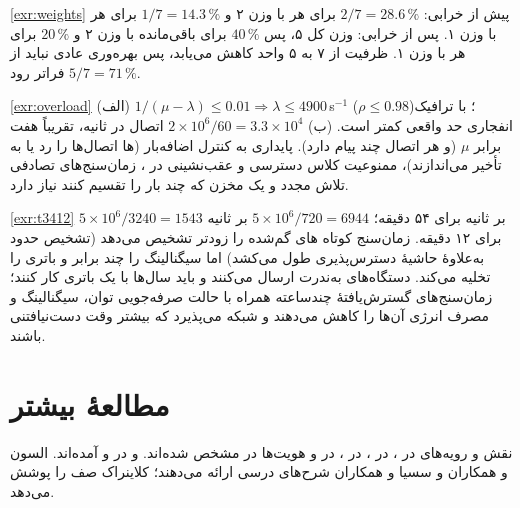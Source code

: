 \documentclass[11pt,a4paper]{article}
\begin{document}
\begin{solutionbox}{\ref{exr:weights}}
پیش از خرابی: $2/7 = 28.6\,\%$ برای هر  با وزن ۲ و $1/7 = 14.3\,\%$ برای هر  با وزن ۱. پس از خرابی: وزن کل ۵،
پس $40\,\%$ برای  باقی‌مانده با وزن ۲ و $20\,\%$ برای هر  با وزن ۱. ظرفیت از ۷ به ۵ واحد کاهش می‌یابد،
پس بهره‌وری عادی نباید از $5/7 = 71\,\%$ فراتر رود.
\end{solutionbox}

\begin{solutionbox}{\ref{exr:overload}}
(الف) $1/(\mu-\lambda) \le 0.01 \Rightarrow \lambda \le 4900$\,s$^{-1}$ ($\rho \le 0.98$)؛ با ترافیک انفجاری حد واقعی کمتر است.
(ب) $2\times10^6/60 = 3.3\times10^4$ اتصال در ثانیه، تقریباً هفت برابر $\mu$ (و هر اتصال چند پیام دارد). پایداری به کنترل
اضافه‌بار  (ها اتصال‌ها را رد یا به تأخیر می‌اندازند)، ممنوعیت کلاس دسترسی و عقب‌نشینی  در
، زمان‌سنج‌های تصادفی تلاش مجدد  و یک مخزن که چند  بار را تقسیم کنند نیاز دارد.
\end{solutionbox}

\begin{solutionbox}{\ref{exr:t3412}}
$5\times10^6/3240 = 1543$  بر ثانیه برای ۵۴ دقیقه؛ $5\times10^6/720 = 6944$  بر ثانیه برای ۱۲ دقیقه.
زمان‌سنج کوتاه های گم‌شده را زودتر تشخیص می‌دهد (تشخیص حدود  به‌علاوهٔ حاشیهٔ دسترس‌پذیری طول
می‌کشد) اما سیگنالینگ را چند برابر و باتری را تخلیه می‌کند. دستگاه‌های  به‌ندرت ارسال می‌کنند و باید سال‌ها با
یک باتری کار کنند؛ زمان‌سنج‌های گسترش‌یافتهٔ چندساعته همراه با حالت صرفه‌جویی توان، سیگنالینگ و مصرف انرژی آن‌ها را
کاهش می‌دهند و شبکه می‌پذیرد که بیشتر وقت دست‌نیافتنی باشند.
\end{solutionbox}

\section{مطالعهٔ بیشتر}
نقش و رویه‌های  در  \cite{ts23401}،  در  \cite{ts24301}،  در
 \cite{ts36413}،  در  \cite{ts29274} و هویت‌ها در  \cite{ts23003}
مشخص شده‌اند.  و  در  \cite{ts23272} و  \cite{ts23216} آمده‌اند. السون و
همکاران \cite{olsson2013epc} و سسیا و همکاران \cite{sesia2011lte} شرح‌های درسی ارائه می‌دهند؛ کلاینراک
\cite{kleinrock1975queueing} صف  را پوشش می‌دهد.

\begin{latin}
\printbibliography[heading=subbibliography,title={References}]
\end{latin}
\end{document}
